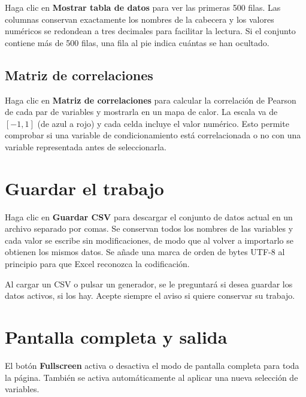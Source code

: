 \documentclass[11pt,a4paper]{article}
\begin{document}
Haga clic en \textbf{Mostrar tabla de datos} para ver las primeras 500 filas. Las columnas conservan exactamente los nombres de la cabecera y los valores numéricos se redondean a tres decimales para facilitar la lectura. Si el conjunto contiene más de 500 filas, una fila al pie indica cuántas se han ocultado.

\subsection{Matriz de correlaciones}

Haga clic en \textbf{Matriz de correlaciones} para calcular la correlación de Pearson de cada par de variables y mostrarla en un mapa de calor. La escala va de $[-1,1]$ (de azul a rojo) y cada celda incluye el valor numérico. Esto permite comprobar si una variable de condicionamiento está correlacionada o no con una variable representada antes de seleccionarla.

\section{Guardar el trabajo}

Haga clic en \textbf{Guardar CSV} para descargar el conjunto de datos actual en un archivo separado por comas. Se conservan todos los nombres de las variables y cada valor se escribe sin modificaciones, de modo que al volver a importarlo se obtienen los mismos datos. Se añade una marca de orden de bytes UTF-8 al principio para que Excel reconozca la codificación.

\begin{warnbox}
Al cargar un CSV o pulsar un generador, se le preguntará si desea guardar los datos activos, si los hay. Acepte siempre el aviso si quiere conservar su trabajo.
\end{warnbox}

\section{Pantalla completa y salida}

El botón \textbf{Fullscreen} activa o desactiva el modo de pantalla completa para toda la página. También se activa automáticamente al aplicar una nueva selección de variables.
\end{document}
